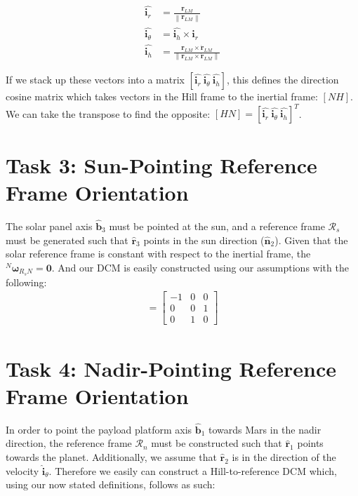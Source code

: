 \documentclass[paper]{aiaaNew}
\newcommand{\norm}[1]{\left\lVert#1\right\rVert}
\begin{document}
\begin{align}
  \hat{\bm{i}_r} &= \frac{\bm{r}_{LM}}{\norm{\bm{r}_{LM}}} \\
  \hat{\bm{i}_\theta} &= \hat{\bm{i}_h} \times \hat{\bm{i}_r} \\
  \hat{\bm{i}_h} &= \frac{\bm{r}_{LM} \times \dot{\bm{r}}_{LM}}{\norm{\bm{r}_{LM} \times \dot{\bm{r}}_{LM}}}
\end{align}

If we stack up these vectors into a matrix $[\hat{\bm{i}_r} \ \hat{\bm{i}_\theta} \ \hat{\bm{i}_h}]$, this defines the direction cosine matrix which takes vectors in the Hill frame to the inertial frame: $[NH]$. We can take the transpose to find the opposite: $[HN] = [\hat{\bm{i}_r} \ \hat{\bm{i}_\theta} \ \hat{\bm{i}_h}]^T$.









\section*{Task 3: Sun-Pointing Reference Frame Orientation}
The solar panel axis $\hat{\bm{b}}_3$ must be pointed at the sun, and a reference frame $\mathcal{R}_s$ must be generated such that $\hat{\bm{r}}_3$ points in the sun direction ($\hat{\bm{n}}_2$). Given that the solar reference frame is constant with respect to the inertial frame, the $^N\bm{\omega}_{R_s N} = \bm{0}$. And our DCM is easily constructed using our assumptions with the following: 
\begin{align}
  [R_sN] =  
  \begin{bmatrix}
  -1 & 0 & 0 \\
  0 & 0 & 1 \\
  0 & 1 & 0
  \end{bmatrix}
\end{align}








\section*{Task 4: Nadir-Pointing Reference Frame Orientation}
In order to point the payload platform axis $\hat{\bm{b}}_1$ towards Mars in the nadir direction, the reference frame $\mathcal{R}_n$ must be constructed such that $\hat{\bm{r}}_1$ points towards the planet. Additionally, we assume that $\hat{\bm{r}}_2$ is in the direction of the velocity $\hat{\bm{i}}_\theta$. Therefore we easily can construct a Hill-to-reference DCM which, using our now stated definitions, follows as such: 
\end{document}
